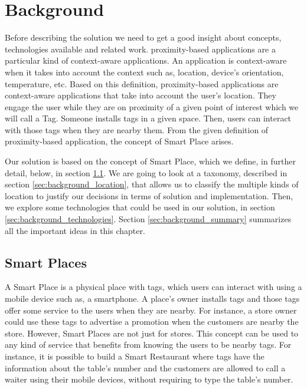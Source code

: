 
\chapter{Background}
\label{chapter:background}
Before describing the solution we need to get a good insight about concepts, technologies available and related work.
proximity-based applications are a particular kind of context-aware applications.
An application is context-aware when it takes into account the context such as, location, device's orientation, temperature, etc.
Based on this definition, proximity-based applications are context-aware applications that take into account the user's location.
They engage the user while they are on proximity of a given point of interest which we will call a Tag.
Someone installs tags in a given space.
Then, users can interact with those tags when they are nearby them.
From the given definition of proximity-based application, the concept of Smart Place arises.

Our solution is based on the concept of Smart Place, which we define, in further detail, below, in section \ref{sec:background_smart_places}.
We are going to look at a taxonomy, described in section \ref{sec:background_location}, that allows us to classify the multiple kinds of location to justify our decisions in terms of solution and implementation.
Then, we explore some technologies that could be used in our solution, in section \ref{sec:background_technologies}.
Section \ref{sec:background_summary} summarizes all the important ideas in this chapter.

\section{Smart Places}
\label{sec:background_smart_places}
A Smart Place is a physical place with tags, which users can interact with using a mobile device such as, a smartphone.
A place's owner installs tags and those tags offer some service to the users when they are nearby.
For instance, a store owner could use these tags to advertise a promotion when the customers are nearby the store.
However, Smart Places are not just for stores.
This concept can be used to any kind of service that benefits from knowing the users to be nearby tags.
For instance, it is possible to build a Smart Restaurant where tags have the information about the table's number and the customers are allowed to call a waiter using their mobile devices, without requiring to type the table's number.

